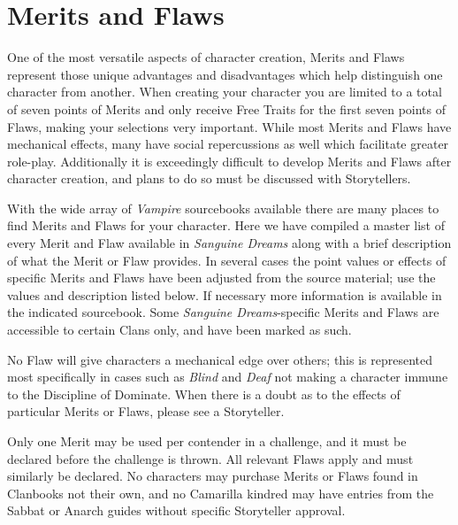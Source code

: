 \section{Merits and Flaws}
\label{sec:merits}
One of the most versatile aspects of character creation, Merits and Flaws 
represent those unique advantages and disadvantages which help distinguish 
one character from another.  When creating your character you are limited 
to a total of seven points of Merits and only receive Free Traits for the 
first seven points of Flaws, making your selections very important.  While 
most Merits and Flaws have mechanical effects, many have social repercussions 
as well which facilitate greater role-play.  Additionally it is exceedingly 
difficult to develop Merits and Flaws after character creation, and plans to 
do so must be discussed with Storytellers.

With the wide array of \emph{Vampire} sourcebooks available there are many places 
to find Merits and Flaws for your character.  Here we have compiled a master list 
of every Merit and Flaw available in \emph{Sanguine Dreams} along with a brief 
description of what the Merit or Flaw provides.  In several cases the point values 
or effects of specific Merits and Flaws have been adjusted from the source material; 
use the values and description listed below.  If necessary more information is 
available in the indicated sourcebook. Some \emph{Sanguine Dreams}-specific Merits and 
Flaws are accessible to certain Clans only, and have been marked as such.

No Flaw will give characters a mechanical edge over others; this is represented 
most specifically in cases such as \emph{Blind} and \emph{Deaf} not making a 
character immune to the Discipline of Dominate.  When there is a doubt as to the 
effects of particular Merits or Flaws, please see a Storyteller.

Only one Merit may be used per contender in a challenge, and it must be declared 
before the challenge is thrown. All relevant Flaws apply and must similarly be 
declared.  No characters may purchase Merits or Flaws found in Clanbooks not their 
own, and no Camarilla kindred may have entries from the Sabbat or Anarch guides 
without specific Storyteller approval. \\

